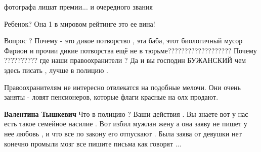 \begin{itemize}
фотографа лишат премии... и очередного звания

 
Ребенок? Она 1 в мировом рейтинге это ее вина!

 

Вопрос ? Почему - это дикое потворство , эта баба, этот биологичный мусор
Фарион и прочии дикие потворства ещё не в тюрьме??????????????????? Почему
?????????? где наши правоохранители ? Да и вы господин БУЖАНСКИЙ чем здесь
писать , лучше в полицию .

\begin{itemize}
 
Правоохранителям не интересно отвлекатся на подобные мелочи. Они очень заняты -
ловят пенсионеров, которые флаги красные на олх продают.

 
\textbf{Валентина Тышкевич} Что в полицию ? Ваши действия . Вы знаете вот у нас
есть такое семейное насилие . Вот избил мужлан жену а она заяву не пишет у нее
любовь , и что все по закону его отпускают . Была заява от девушки нет конечно
промыли мозг все пишите письма как говорят ...
\end{itemize}

 


\end{itemize}
